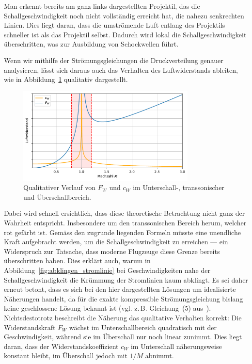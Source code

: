 Man erkennt bereits am ganz links dargestellten Projektil, 
das die Schallgeschwindigkeit noch nicht vollständig 
erreicht hat, die nahezu senkrechten Linien. 
Dies liegt daran, dass die umströmende Luft entlang 
des Projektils schneller ist als das Projektil selbst. 
Dadurch wird lokal die Schallgeschwindigkeit überschritten, 
was zur Ausbildung von Schockwellen führt.

Wenn wir mithilfe der Strömungsgleichungen die Druckverteilung genauer analysieren, 
lässt sich daraus auch das Verhalten des Luftwiderstands ableiten, 
wie in Abbildung~\ref{fig:luftwiderstand} qualitativ dargestellt.
\begin{figure}
    \centering
    \includegraphics[width=0.8\textwidth]{papers/ueberschall/figures/Luftwiderstand_qual.pdf}
    \caption{Qualitativer Verlauf von $F_W$ und $c_W$ im Unterschall-, transsonischer und Überschallbereich.}
    \label{fig:luftwiderstand}
\end{figure}
Dabei wird schnell ersichtlich, dass diese theoretische 
Betrachtung nicht ganz der Wahrheit entspricht.
Insbesondere um den transsonischen Bereich herum, welcher rot gefärbt ist.
Gemäss den zugrunde liegenden Formeln müsste eine 
unendliche Kraft aufgebracht werden, 
um die Schallgeschwindigkeit zu erreichen — ein Widerspruch zur Tatsache, 
dass moderne Flugzeuge diese Grenze bereits überschritten haben.
Dies erklärt auch, warum in Abbildung~\ref{fig:abklingen_stromlinie} 
bei Geschwindigkeiten nahe der Schallgeschwindigkeit die Krümmung 
der Stromlinien kaum abklingt.
Es sei daher erneut betont, dass es sich bei den hier 
dargestellten Lösungen um idealisierte Näherungen handelt,
da für die exakte kompressible Strömungsgleichung bislang 
keine geschlossene Lösung bekannt ist 
(vgl. z.\,B. Gleichung~(5) aus~\cite{Ackeret1928}).
Nichtsdestotrotz beschreibt die Näherung das qualitative Verhalten korrekt:
Die Widerstandskraft $F_W$ wächst im Unterschallbereich quadratisch mit 
der Geschwindigkeit, während sie im Überschall nur noch linear zunimmt. 
Dies liegt daran, dass der Widerstandskoeffizient $c_W$ im Unterschall 
näherungsweise konstant bleibt, im Überschall 
jedoch mit $1/M$ abnimmt.

